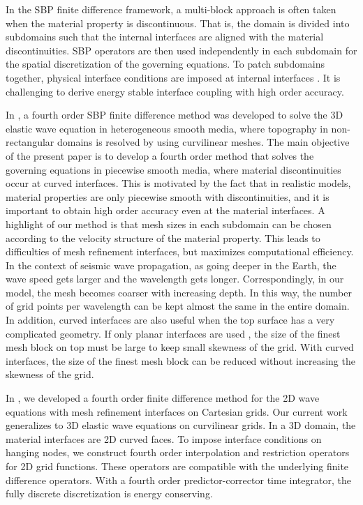 In the SBP finite difference framework, a multi-block approach is often taken when the material property is discontinuous. That is, the domain is divided into subdomains such that the internal interfaces are aligned with the material discontinuities. SBP operators are then used independently in each subdomain for the spatial discretization of the governing equations. To patch subdomains together, physical interface conditions are imposed at internal interfaces \cite{Almquist2019,duru2014stable}. It is challenging to derive energy stable interface coupling with high order accuracy. 

In \cite{petersson2015wave}, a fourth order SBP finite difference method was developed to solve the 3D elastic wave equation in heterogeneous smooth media, where topography in non-rectangular domains is resolved by using curvilinear meshes. The main objective of the present paper is to develop a fourth order method that solves the governing equations in piecewise smooth media, where material discontinuities occur at curved interfaces.   This is motivated by the fact that in realistic models, material properties are only piecewise smooth with discontinuities, and it is important to obtain high order accuracy even at the material interfaces. A highlight of our method is that mesh sizes in each subdomain can be chosen according to the velocity structure of the material property. This leads to difficulties of mesh refinement interfaces, but maximizes computational efficiency. In the context of seismic wave propagation, as going deeper in the Earth, the wave speed gets larger and the wavelength gets longer. Correspondingly, in our model, the mesh becomes coarser with increasing depth. In this way, the number of grid points per wavelength can be kept almost the same in the entire domain. In addition, curved interfaces are also useful when the top surface has a very complicated geometry. If only planar interfaces are used \cite{SW4}, the size of the finest mesh block on top must be large to keep small skewness of the grid. With curved interfaces, the size of the finest mesh block can be reduced without increasing the skewness of the grid. 

In \cite{wang2018fourth}, we developed a fourth order finite difference method for the 2D wave equations with mesh refinement interfaces on Cartesian grids. Our current work generalizes to 3D elastic wave equations on curvilinear grids. In a 3D domain, the material interfaces are 2D curved faces. To impose interface conditions on hanging nodes, we construct fourth order interpolation and restriction operators for 2D grid functions. These operators are compatible with the underlying finite difference operators. With a fourth order predictor-corrector time integrator, the fully discrete discretization is energy conserving. 

